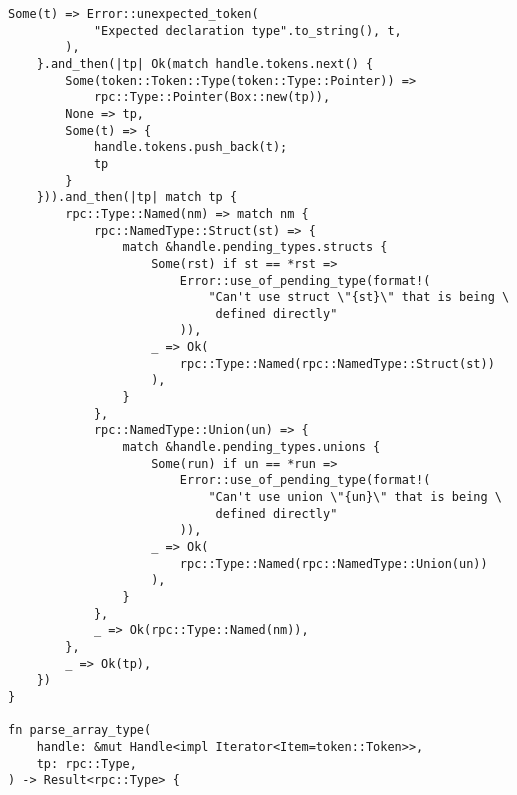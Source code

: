 \begin{lstlisting}[caption={Разбор типа (часть 4)}, label={lst:rust_parser_type4}]
        Some(t) => Error::unexpected_token(
            "Expected declaration type".to_string(), t,
        ),
    }.and_then(|tp| Ok(match handle.tokens.next() {
        Some(token::Token::Type(token::Type::Pointer)) =>
            rpc::Type::Pointer(Box::new(tp)),
        None => tp,
        Some(t) => {
            handle.tokens.push_back(t);
            tp
        }
    })).and_then(|tp| match tp {
        rpc::Type::Named(nm) => match nm {
            rpc::NamedType::Struct(st) => {
                match &handle.pending_types.structs {
                    Some(rst) if st == *rst =>
                        Error::use_of_pending_type(format!(
                            "Can't use struct \"{st}\" that is being \
                             defined directly"
                        )),
                    _ => Ok(
                        rpc::Type::Named(rpc::NamedType::Struct(st))
                    ),
                }
            },
            rpc::NamedType::Union(un) => {
                match &handle.pending_types.unions {
                    Some(run) if un == *run =>
                        Error::use_of_pending_type(format!(
                            "Can't use union \"{un}\" that is being \
                             defined directly"
                        )),
                    _ => Ok(
                        rpc::Type::Named(rpc::NamedType::Union(un))
                    ),
                }
            },
            _ => Ok(rpc::Type::Named(nm)),
        },
        _ => Ok(tp),
    })
}

fn parse_array_type(
    handle: &mut Handle<impl Iterator<Item=token::Token>>,
    tp: rpc::Type,
) -> Result<rpc::Type> {
\end{lstlisting}
\clearpage
